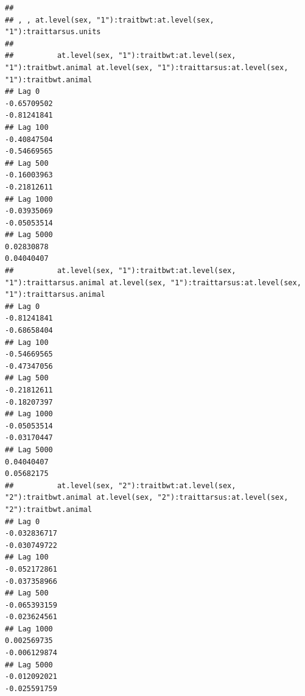 \documentclass[
  12pt,
]{book}
\begin{document}
\begin{verbatim}
## 
## , , at.level(sex, "1"):traitbwt:at.level(sex, "1"):traittarsus.units
## 
##          at.level(sex, "1"):traitbwt:at.level(sex, "1"):traitbwt.animal at.level(sex, "1"):traittarsus:at.level(sex, "1"):traitbwt.animal
## Lag 0                                                       -0.65709502                                                       -0.81241841
## Lag 100                                                     -0.40847504                                                       -0.54669565
## Lag 500                                                     -0.16003963                                                       -0.21812611
## Lag 1000                                                    -0.03935069                                                       -0.05053514
## Lag 5000                                                     0.02830878                                                        0.04040407
##          at.level(sex, "1"):traitbwt:at.level(sex, "1"):traittarsus.animal at.level(sex, "1"):traittarsus:at.level(sex, "1"):traittarsus.animal
## Lag 0                                                          -0.81241841                                                          -0.68658404
## Lag 100                                                        -0.54669565                                                          -0.47347056
## Lag 500                                                        -0.21812611                                                          -0.18207397
## Lag 1000                                                       -0.05053514                                                          -0.03170447
## Lag 5000                                                        0.04040407                                                           0.05682175
##          at.level(sex, "2"):traitbwt:at.level(sex, "2"):traitbwt.animal at.level(sex, "2"):traittarsus:at.level(sex, "2"):traitbwt.animal
## Lag 0                                                      -0.032836717                                                      -0.030749722
## Lag 100                                                    -0.052172861                                                      -0.037358966
## Lag 500                                                    -0.065393159                                                      -0.023624561
## Lag 1000                                                    0.002569735                                                      -0.006129874
## Lag 5000                                                   -0.012092021                                                      -0.025591759

\end{verbatim}
\end{document}
